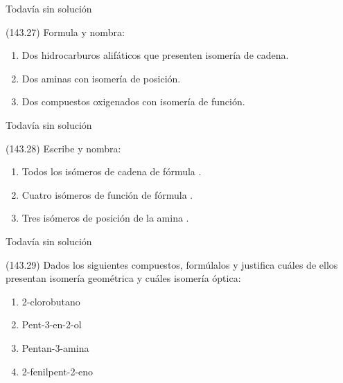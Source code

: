   \begin{solution}[print=false]
    Todavía sin solución
  \end{solution}




  \begin{exercise}[
      tags    = {},
      topics  = {química, química orgánica, orgánica},
      source  = {FQ 1B MGH 2016, p143, e27},
    ]
    (143.27) Formula y nombra:
    \begin{enumerate}
      \item Dos hidrocarburos alifáticos que presenten isomería de cadena.
      \item Dos aminas con isomería de posición.
      \item Dos compuestos oxigenados con isomería de función.
    \end{enumerate}
  \end{exercise}

  \begin{solution}[print=false]
    Todavía sin solución
  \end{solution}




  \begin{exercise}[
      tags    = {},
      topics  = {química, química orgánica, orgánica},
      source  = {FQ 1B MGH 2016, p143, e28},
    ]
    (143.28) Escribe y nombra:
    \begin{enumerate}
      \item Todos los isómeros de cadena de fórmula .
      \item Cuatro isómeros de función de fórmula .
      \item Tres isómeros de posición de la amina .
    \end{enumerate}
  \end{exercise}

  \begin{solution}[print=false]
    Todavía sin solución
  \end{solution}




  \begin{exercise}[
      tags    = {},
      topics  = {química, química orgánica, orgánica},
      source  = {FQ 1B MGH 2016, p143, e29},
    ]
    (143.29) Dados los siguientes compuestos, formúlalos y justifica cuáles
    de ellos presentan isomería geométrica y cuáles isomería
    óptica:
    \begin{enumerate}
      \item 2-clorobutano
      \item Pent-3-en-2-ol
      \item Pentan-3-amina
      \item 2-fenilpent-2-eno
    \end{enumerate}
  \end{exercise}

